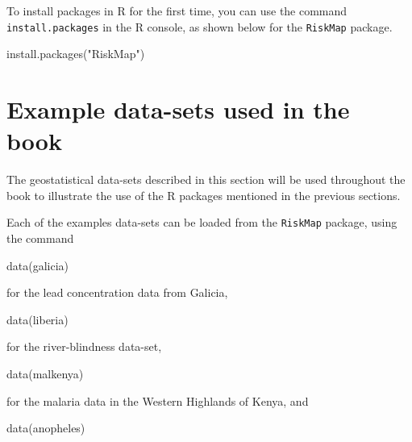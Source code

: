 \documentclass[
  letterpaper,
]{krantz}
\newenvironment{Shaded}{\begin{snugshade}}{\end{snugshade}}
\newcommand{\FunctionTok}[1]{\textcolor[rgb]{0.28,0.35,0.67}{#1}}
\newcommand{\NormalTok}[1]{\textcolor[rgb]{0.00,0.23,0.31}{#1}}
\newcommand{\StringTok}[1]{\textcolor[rgb]{0.13,0.47,0.30}{#1}}
\begin{document}
To install packages in R for the first time, you can use the command
\texttt{install.packages} in the R console, as shown below for the
\texttt{RiskMap} package.

\begin{Shaded}
\begin{Highlighting}[]
\FunctionTok{install.packages}\NormalTok{(}\StringTok{"RiskMap"}\NormalTok{)}
\end{Highlighting}
\end{Shaded}

\hypertarget{sec-examples-ch1}{%
\section{Example data-sets used in the book}\label{sec-examples-ch1}}

The geostatistical data-sets described in this section will be used
throughout the book to illustrate the use of the R packages mentioned in
the previous sections.

Each of the examples data-sets can be loaded from the \texttt{RiskMap}
package, using the command

\begin{Shaded}
\begin{Highlighting}[]
\FunctionTok{data}\NormalTok{(galicia)}
\end{Highlighting}
\end{Shaded}

for the lead concentration data from Galicia,

\begin{Shaded}
\begin{Highlighting}[]
\FunctionTok{data}\NormalTok{(liberia)}
\end{Highlighting}
\end{Shaded}

for the river-blindness data-set,

\begin{Shaded}
\begin{Highlighting}[]
\FunctionTok{data}\NormalTok{(malkenya)}
\end{Highlighting}
\end{Shaded}

for the malaria data in the Western Highlands of Kenya, and

\begin{Shaded}
\begin{Highlighting}[]
\FunctionTok{data}\NormalTok{(anopheles)}
\end{Highlighting}
\end{Shaded}
\end{document}
